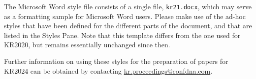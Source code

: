 \documentclass{article}
\begin{document}
The Microsoft Word style file consists of a single file, \texttt{kr21.docx},
which may serve as a formatting sample for Microsoft Word users.  Please make
use of the ad-hoc styles that have been defined for the different parts of the
document, and that are listed in the Styles Pane.  Note that this template
differs from the one used for KR2020, but remains essentially unchanged since then.

Further information on using these styles for the preparation of papers for
KR2024 can be obtained by contacting
\href{mailto:kr.proceedings@confdna.com}{kr.proceedings@confdna.com}.




\end{document}

